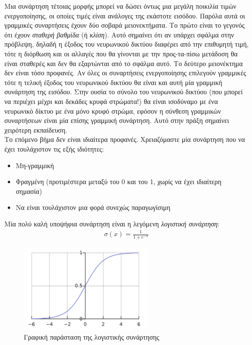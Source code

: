 \documentclass[11pt]{article} %
\numberwithin{equation}{subsection}
\begin{document}
Μια συνάρτηση τέτοιας μορφής μπορεί να δώσει όντως μια μεγάλη ποικιλία τιμών ενεργοποίησης, οι οποίες τιμές είναι ανάλογες της εκάστοτε εισόδου. Παρόλα αυτά οι γραμμικές συναρτήσεις έχουν δύο σοβαρά μειονεκτήματα. Το πρώτο είναι το γεγονός ότι έχουν \textit{σταθερή βαθμίδα} (ή \textit{κλίση}). Αυτό σημαίνει ότι αν υπάρχει σφάλμα στην πρόβλεψη, δηλαδή η έξοδος του νευρωνικού δικτύου διαφέρει από την επιθυμητή τιμή, τότε η διόρθωση και οι αλλαγές που θα γίνονται με την προς-τα-πίσω μετάδοση θα είναι σταθερές και δεν θα εξαρτώνται από το σφάλμα αυτό. Το δεύτερο μειονέκτημα δεν είναι τόσο προφανές. Αν όλες οι συναρτήσεις ενεργοποίησης επιλεγούν γραμμικές τότε η τελική έξοδος του νευρωνικού δικτύου θα είναι και αυτή μία γραμμική συνάρτηση της εισόδου. Στην ουσία το σύνολο του νευρωνικού δικτύου (που μπορεί να περιέχει μέχρι και δεκάδες κρυφά στρώματα!) θα είναι ισοδύναμο με ένα νευρωνικό δίκτυο με ένα μόνο κρυφό στρώμα, εφόσον η σύνθεση γραμμικών συναρτήσεων είναι μία επίσης γραμμική συνάρτηση. Αυτό στην πράξη σημαίνει χειρότερη εκπαίδευση.\\

Το επόμενο βήμα δεν είναι ιδιαίτερα προφανές. Χρειαζόμαστε μία συνάρτηση που να έχει τουλάχιστον τις εξής ιδιότητες:
\begin{itemize}
  \item Μη-γραμμική
  \item Φραγμένη (προτιμέστερα μεταξύ του 0 και του 1, χωρίς να έχει ιδιαίτερη σημασία)
  \item Να είναι τουλάχιστον μια φορά συνεχώς παραγωγίσιμη 
\end{itemize}

Μία πολύ καλή υποψήφια συνάρτηση είναι η λεγόμενη \textit{λογιστική συνάρτηση}:
\begin{align*}
\sigma(x) = \frac{1}{1+e^{-x}}
\end{align*}

\begin{figure}[h]
    \centering
    \includegraphics[width=0.6\textwidth]{logcurve}
    \caption{Γραφική παράσταση της λογιστικής συνάρτησης}
    \label{fig:logistic curve}
\end{figure}
\end{document}
